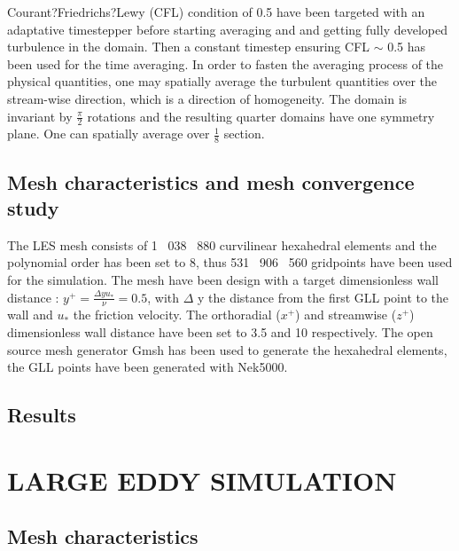 \documentclass[11pt,letterpaper,english]{article}
\begin{document}
Courant?Friedrichs?Lewy (CFL) condition of 0.5 have been targeted with an adaptative timestepper before starting averaging and and getting fully developed turbulence in the domain. Then a constant timestep ensuring CFL $\sim$ 0.5 has been used for the time averaging. 
In order to fasten the averaging process of the physical quantities, one may spatially average the turbulent quantities over the stream-wise direction, which is a direction of homogeneity. The domain is invariant by $\frac{\pi}{2}$ rotations and the resulting quarter domains have one symmetry plane. One can spatially average over $\frac{1}{8}$ section.

\subsection{Mesh characteristics and mesh convergence study}

The LES mesh consists of 1 \ 038 \ 880  curvilinear hexahedral elements and the polynomial order has been set to 8, thus 531 \ 906 \ 560 gridpoints have been used for the simulation. The mesh have been design with a target dimensionless wall distance : $y^{+} = \frac{\Delta y u_{*}}{\nu} = 0.5$, with $\Delta$ y the distance from the first GLL point to the wall and $u_{*}$ the friction velocity. The orthoradial ($x^{+}$) and streamwise ($z^{+}$) dimensionless wall distance have been set to 3.5 and 10 respectively.
The open source mesh generator Gmsh has been used to generate the hexahedral elements, the GLL points have been generated with Nek5000.



\subsection{Results}

\section{LARGE EDDY SIMULATION}
\label{results_nek5000}

\subsection{Mesh characteristics}
\end{document}
